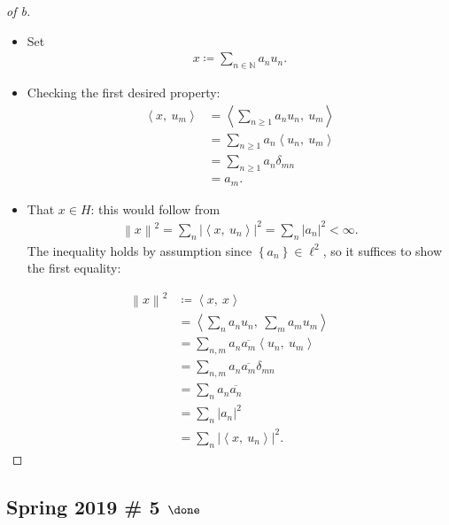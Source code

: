 \begin{solution}
\begin{proof}[of b]
\begin{itemize}
\item
  Set
  \begin{align*}
  x\coloneqq\sum_{n\in {\mathbb{N}}} a_n u_n
  .\end{align*}
\item
  Checking the first desired property:
  \begin{align*}
  {\left\langle {x},~{u_m} \right\rangle} &= {\left\langle { \sum_{n\geq 1} a_n u_n },~{u_m} \right\rangle} \\
  &=\sum_{n\geq 1} a_n  {\left\langle { u_n },~{u_m} \right\rangle} \\
  &=\sum_{n\geq 1} a_n  \delta_{mn} \\
  &= a_m
  .\end{align*}
\item
  That \(x\in H\): this would follow from
  \begin{align*}
  {\left\lVert {x} \right\rVert}^2 = \sum_n {\left\lvert {{\left\langle {x},~{u_n } \right\rangle}} \right\rvert}^2 = \sum_n {\left\lvert {a_n} \right\rvert}^2 <\infty
  .\end{align*}
  The inequality holds by assumption since
  \(\left\{{a_n}\right\}\in\ell^2\), so it suffices to show the first
  equality:
\end{itemize}

\begin{align*}
{\left\lVert {x} \right\rVert}^2 &\coloneqq{\left\langle {x},~{x} \right\rangle} \\
&= {\left\langle {\sum_n a_n u_n},~{\sum_m a_m u_m} \right\rangle} \\
&= \sum_{n, m} a_n {\overline{{a_m}}} {\left\langle {u_n},~{u_m} \right\rangle} \\
&= \sum_{n, m} a_n {\overline{{a_m}}} \delta_{mn} \\
&= \sum_{n} a_n {\overline{{a_n}}} \\
&= \sum_{n} {\left\lvert {a_n} \right\rvert}^2 \\
&= \sum_n {\left\lvert {{\left\langle {x},~{u_n} \right\rangle}} \right\rvert}^2
.\end{align*}

\end{proof}

\end{solution}

\hypertarget{spring-2019-5-done}{%
\subsection{\texorpdfstring{Spring 2019 \# 5
\(\done\)}{Spring 2019 \# 5 \textbackslash done}}\label{spring-2019-5-done}}

